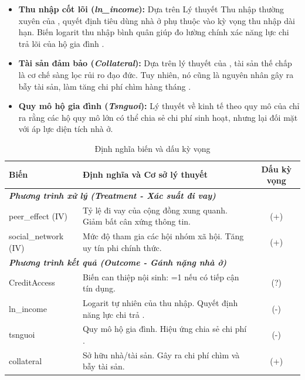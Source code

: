 \documentclass[12pt,a4paper]{report}
\begin{document}
\begin{itemize}
	\item \textbf{Thu nhập cốt lõi  (\textit{ln\_income}):} Dựa trên Lý thuyết Thu nhập thường xuyên của \textcite{Friedman1957}, quyết định tiêu dùng nhà ở phụ thuộc vào kỳ vọng thu nhập dài hạn. Biến logarit thu nhập bình quân giúp đo lường chính xác năng lực chi trả lõi của hộ gia đình \parencite{Zheng2018}.
	\item \textbf{Tài sản đảm bảo  (\textit{Collateral}):} Dựa trên lý thuyết của \textcite{Besley1994}, tài sản thế chấp là cơ chế sàng lọc rủi ro đạo đức. Tuy nhiên, nó cũng là nguyên nhân gây ra bẫy tài sản, làm tăng chi phí chìm hàng tháng \parencite{Arrieta2005, Sato2024}.
	\item \textbf{Quy mô hộ gia đình  (\textit{Tsnguoi}):} Lý thuyết về kinh tế theo quy mô của \textcite{Lipton1980} chỉ ra rằng các hộ quy mô lớn có thể chia sẻ chi phí sinh hoạt, nhưng lại đối mặt với áp lực diện tích nhà ở.
\end{itemize}

\begin{table}[H]
	\centering
	\small
	\caption{Định nghĩa biến và dấu kỳ vọng}
	\begin{tabular}{p{3.5cm} p{8cm} c}
		\toprule
		\textbf{Biến} & \textbf{Định nghĩa và Cơ sở lý thuyết} & \textbf{Dấu kỳ vọng} \\
		\midrule
		\multicolumn{3}{l}{\textit{\textbf{Phương trình xử lý (Treatment - Xác suất đi vay)}}} \\
		\midrule
		peer\_effect (IV) & Tỷ lệ đi vay của cộng đồng xung quanh. Giảm bất cân xứng thông tin. & (+) \\
		social\_network (IV)& Mức độ tham gia các hội nhóm xã hội. Tăng uy tín phi chính thức. & (+) \\
		\midrule
		\multicolumn{3}{l}{\textit{\textbf{Phương trình kết quả (Outcome - Gánh nặng nhà ở)}}} \\
		\midrule
		CreditAccess & Biến can thiệp nội sinh: =1 nếu có tiếp cận tín dụng. & (?) \\
		ln\_income & Logarit tự nhiên của thu nhập. Quyết định năng lực chi trả \parencite{Friedman1957}. & (-) \\
		tsnguoi & Quy mô hộ gia đình. Hiệu ứng chia sẻ chi phí \parencite{Lipton1980}. & (-) \\
		collateral & Sở hữu nhà/tài sản. Gây ra chi phí chìm và bẫy tài sản. & (+) \\
		\bottomrule
	\end{tabular}
\end{table}
\end{document}
